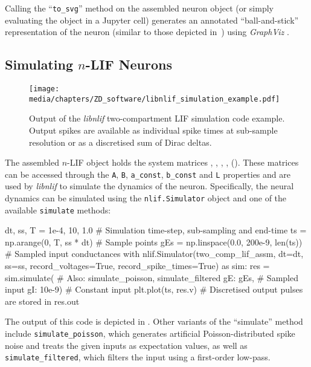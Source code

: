 Calling the \enquote{\texttt{to\_svg}} method on the assembled neuron object (or simply evaluating the object in a Jupyter cell) generates an annotated \enquote{ball-and-stick} representation of the neuron (similar to those depicted in~) using \emph{GraphViz} \citep{ellson2004graphviz}.

\subsection{Simulating $n$-LIF Neurons}

\begin{figure}
	\centering
	\texttt{[image: media/chapters/ZD\_software/libnlif\_simulation\_example.pdf]}
	\label{fig:libnlif_simulation_example}
	\caption[Output of the \emph{libnlif} two-compartment LIF simulation code example]{Output of the \emph{libnlif} two-compartment LIF simulation code example. Output spikes are available as individual spike times at sub-sample resolution or as a discretised sum of Dirac deltas.}
\end{figure}

The assembled $n$-LIF object holds the system matrices \mnAp, \mnBp, \vnap, \vnbp, \mnL ().
These matrices can be accessed through the \texttt{A}, \texttt{B}, \texttt{a\_const}, \texttt{b\_const} and \texttt{L} properties and are used by \emph{libnlif} to simulate the dynamics of the neuron.
Specifically, the neural dynamics can be simulated using the \texttt{nlif.Simulator} object and one of the available \texttt{simulate} methods:
\begin{pythoncode}
dt, ss, T = 1e-4, 10, 1.0     # Simulation time-step, sub-sampling and end-time
ts = np.arange(0, T, ss * dt) # Sample points
gEs = np.linspace(0.0, 200e-9, len(ts)) # Sampled input conductances
with nlif.Simulator(two_comp_lif_assm, dt=dt, ss=ss,
                    record_voltages=True, record_spike_times=True) as sim:
	res = sim.simulate({      # Also: simulate_poisson, simulate_filtered
		gE: gEs,              # Sampled input
		gI: 10e-9})           # Constant input
plt.plot(ts, res.v)           # Discretised output pulses are stored in res.out
\end{pythoncode}
The output of this code is depicted in .
Other variants of the \enquote{simulate} method include \texttt{simulate\_poisson}, which generates artificial Poisson-distributed spike noise \citep[e.g.,][Section~1.4]{abbott2001theoretical} and treats the given inputs as expectation values, as well as \texttt{simulate\_filtered}, which filters the input using a first-order low-pass.

